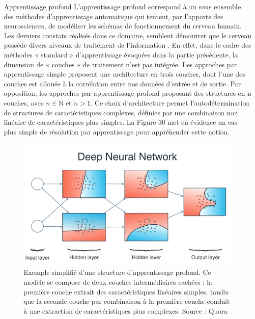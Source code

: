 	

Apprentissage profond
L’apprentissage profond correspond à un sous ensemble des méthodes d’apprentissage automatique qui tentent, par l’apports des neurosciences, de modéliser les schémas de fonctionnement du cerveau humain. Les derniers constats réalisés dans ce domaine, semblent démontrer que le cerveau possède divers niveaux de traitement de l’information . 
En effet, dans le cadre des méthodes « standard » d’apprentissage évoquées dans la partie précédente, la dimension de « couches » de traitement n’est pas intégrée. Les approches par apprentissage simple proposent une architecture en trois couches, dont l’une des couches est allouée à la corrélation entre nos données d’entrée et de sortie. Par opposition, les approches par apprentissage profond proposant des structures en n couches, avec $n \in \pmb{\mathbb{N}}$ et $n>1$. 
Ce choix d’architecture permet l’autodétermination de structures de caractéristiques complexes, définies par une combinaison non linéaire de caractéristiques plus simples. La  Figure 30 met en évidence un cas plus simple de résolution par apprentissage pour appréhender cette notion. 
 
\begin{figure}[H]
    \centering
    \includegraphics[width=\linewidth]{contents/chapter_3/resources/DeepUnderstanding.png}
    \caption{Exemple simplifié d'une structure d’apprentissage profond. Ce modèle se compose de deux couches intermédiaires cachées : la première couche extrait des caractéristiques linéaires simples, tandis que la seconde couche par combinaison à la première couche conduit à une extraction de caractéristiques plus complexes. Source : Quora}
    \label{fig:chapter_3:deep_understanding}
\end{figure}

